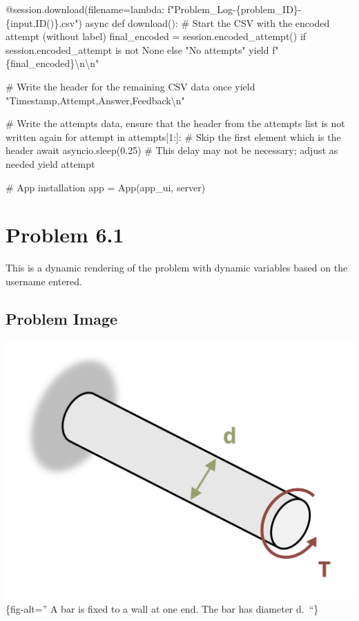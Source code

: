 \documentclass[
  letterpaper,
  DIV=11,
  numbers=noendperiod]{scrreprt}
\newenvironment{Shaded}{\begin{snugshade}}{\end{snugshade}}
\newcommand{\NormalTok}[1]{\textcolor[rgb]{0.00,0.23,0.31}{#1}}
\begin{document}
\begin{Shaded}
\begin{Highlighting}[]
\NormalTok{    @session.download(filename=lambda: f"Problem\_Log{-}\{problem\_ID\}{-}\{input.ID()\}.csv")}
\NormalTok{    async def download():}
\NormalTok{        \# Start the CSV with the encoded attempt (without label)}
\NormalTok{        final\_encoded = session.encoded\_attempt() if session.encoded\_attempt is not None else "No attempts"}
\NormalTok{        yield f"\{final\_encoded\}\textbackslash{}n\textbackslash{}n"}
        
\NormalTok{        \# Write the header for the remaining CSV data once}
\NormalTok{        yield "Timestamp,Attempt,Answer,Feedback\textbackslash{}n"}
        
\NormalTok{        \# Write the attempts data, ensure that the header from the attempts list is not written again}
\NormalTok{        for attempt in attempts[1:]:  \# Skip the first element which is the header}
\NormalTok{            await asyncio.sleep(0.25)  \# This delay may not be necessary; adjust as needed}
\NormalTok{            yield attempt}


\NormalTok{\# App installation}
\NormalTok{app = App(app\_ui, server)}
\end{Highlighting}
\end{Shaded}

\chapter*{Problem 6.1}\label{problem-6.1}


This is a dynamic rendering of the problem with dynamic variables based
on the username entered.

\section*{Problem Image}\label{problem-image-59}


\includegraphics{images/265.png}\{fig-alt='' A bar is fixed to a wall at
one end. The bar has diameter d.~``\}
\end{document}

